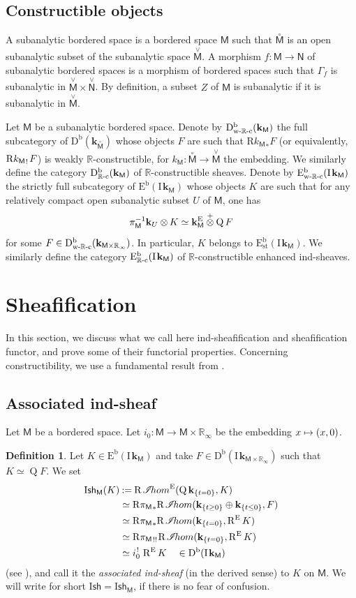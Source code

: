 \documentclass[11pt]{article}
\numberwithin{equation}{section}
\let\mathcal\mathscr
\newcommand\mto{\mathchoice{\longmapsto}{\mapsto}{\mapsto}{\mapsto}}
\newcommand{\accentset}[2]{\overset{#1}{#2}}
\theoremstyle{plain}
\theoremstyle{definition}
\newtheorem{definition}[theorem]{Definition}
\newcommand{\R}{\mathbb{R}}
\newcommand{\bR}{{\R_\infty}}
\DeclareMathOperator{\quot}{Q}
\newcommand{\derived}[1]{\mathrm{#1}}
\newcommand{\derd}{\derived{D}}
\newcommand{\dere}{\derived{E}}\let\enh\dere
\newcommand{\derr}{\derived{R}}
\newcommand{\BDC}{\derd^{\mathrm{b}}}
\newcommand{\BEC}[2][\ifield]{\dere^{\mathrm{b}}(#1_{#2})}
\newcommand{\BECs}[2][\ifield]{\dere^{\mathrm{b}}_\stab(#1_{#2})}
\newcommand{\BECRc}[2][\ifield]{\dere^{\mathrm{b}}_\Rc(#1_{#2})}
\newcommand{\BECwRc}[2][\ifield]{\dere^{\mathrm{b}}_\wRc(#1_{#2})}
\newcommand{\roim}[1]{\derr#1_*}
\newcommand{\reim}[1]{\derr#1_{\mspace{.5mu}!}\mspace{2mu}}
\newcommand{\reeim}[1]{\derr#1_{\mspace{1mu}!!}\mspace{1mu}}
\newcommand{\rihom}{{\derr\mspace{2mu}\shi\!hom}}
\newcommand{\fihom}{\rihom^\enh}
\newcommand{\epb}[1]{#1^{\mspace{1.5mu}!}\mspace{2mu}}
\newcommand{\sheaffont}[1]{\mathcal{#1}}
\newcommand\shi{\sheaffont{I}}
\newcommand{\RE}{\operatorname{R^\enh}}
\newcommand{\stab}{{\operatorname{st}}}
\newcommand{\Rc}{{\R\text-\mathrm{c}}}
\newcommand{\wRc}{{\mathrm{w}\text-\R\text-\mathrm{c}}}
\newcommand{\field}{\mathbf{k}}\let\cor\field
\newcommand{\ind}{\mathrm{I}\mspace{2mu}}
\newcommand{\ifield}{\ind\field}
\newcommand{\bclose}[1]{{\accentset{\vee}{#1}}}\let\cc\bclose
\newcommand{\unbordered}[1]{{\accentset{\circ}{#1}}}
\newcommand{\ctens}{\mathbin{\mathop\otimes\limits^+}}
\newcommand{\Ish}{\mathrm{I}\mathsf{sh}}
\newcommand{\bbM}{\mathsf{M}}
\newcommand{\obM}{\unbordered{\bbM}}
\newcommand{\cbM}{\bclose{\bbM}}
\newcommand{\bbN}{\mathsf{N}}
\newcommand{\cbN}{\bclose{\bbN}}
\newcommand{\inc}[1][\bbM]{k_{#1}}
\newcommand{\defeq}{\mathbin{:=}}\let \seteq\defeq
\newcommand{\tens}[1][]{\mathbin{\otimes_{\raise1.5ex\hbox to-.1em{}#1}}}
\newcommand{\st}[1]{{\{{#1}\}}}
\newcommand{\opb}[1]{#1^{-1}}
\begin{document}
\subsection{Constructible objects}
A subanalytic bordered space is a bordered space $\bbM$ such that $\obM$ is an open subanalytic subset of the subanalytic space $\cbM$. A morphism $f\colon\bbM\to\bbN$ of subanalytic bordered spaces is a morphism of bordered spaces such that $\Gamma_f$ is subanalytic in $\cbM\times\cbN$.
By definition, a subset $Z$ of $\bbM$ is subanalytic if it is subanalytic in $\cbM$.


Let $\bbM$ be a subanalytic bordered space. Denote by $\BDC_\wRc(\field_\bbM)$ the full subcategory of $\BDC(\field_\obM)$ whose objects $F$ are such that $\roim{{\inc}} F$ (or equivalently, $\reim{{\inc}} F$) is weakly $\R$-constructible, for $\inc\colon \obM\to\cbM$ the embedding.
We similarly define the category $\BDC_\Rc(\field_\bbM)$ of $\R$-constructible sheaves. Denote by
$\BECwRc\bbM$ the strictly full subcategory of $\BEC\bbM$ whose objects $K$
are such that for any relatively compact open subanalytic subset $U$ of $\bbM$,
one has
\[
\opb{\pi_\bbM}\field_U\tens K \simeq \field_\bbM^\enh \ctens \quot F
\]
for some $F\in \BDC_\wRc(\field_{\bbM\times\bR})$.
In particular, $K$ belongs to $\BECs\bbM$.
We similarly define the category $\BECRc\bbM$ of $\R$-constructible enhanced ind-sheaves.

\section{Sheafification}\label{se:sh}

In this section, we discuss what we call here ind-sheafification and sheafification functor, and prove some of their functorial properties. Concerning constructibility, we use a fundamental result from \cite[\S6]{KS16}.

\subsection{Associated ind-sheaf}

Let $\bbM$ be a bordered space.
Let $i_0\colon\bbM\to\bbM\times\bR$ be the embedding $x\mto(x,0)$.

\begin{definition}
Let $K\in\BEC \bbM$ and take
$F\in\BDC(\ifield_{\bbM\times\bR})$ such that $K\simeq\quot F$.
We set
\begin{align*}
\Ish_\bbM(K) &\defeq \fihom(\quot\field_{\st{t=0}},K) \\
&\simeq \roim{{\pi_\bbM}}\rihom(\field_{\st{t\ge0}}\oplus\field_{\st{t\le0}}, F) \\
&\simeq\roim{{\pi_\bbM}}\rihom(\field_{\st{t=0}}, \RE K) \\
&\simeq \reeim{{\pi_\bbM}}\rihom(\field_{\st{t=0}}, \RE K) \\
&\simeq \epb{i_0}\RE K \quad \in \BDC(\ifield_\bbM)
\end{align*}
(see \cite[Lem.\,4.5.16]{DK16}), and call it the \emph{associated ind-sheaf} (in the derived sense) to $K$ on $\bbM$.
We will write for short $\Ish=\Ish_\bbM$, if there is no fear of confusion.
\end{definition}
\end{document}
